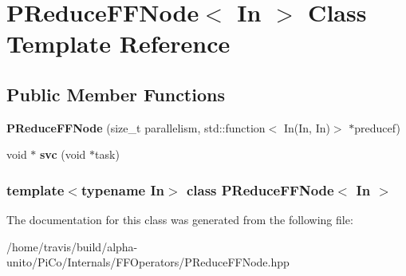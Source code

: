 \hypertarget{class_p_reduce_f_f_node}{\section{\-P\-Reduce\-F\-F\-Node$<$ \-In $>$ \-Class \-Template \-Reference}
\label{class_p_reduce_f_f_node}
}
\subsection*{\-Public \-Member \-Functions}
\begin{DoxyCompactItemize}
\item 
\hypertarget{class_p_reduce_f_f_node_a3ae9363397f2577359fd00dacd5c0bab}{{\bfseries \-P\-Reduce\-F\-F\-Node} (size\-\_\-t parallelism, std\-::function$<$ \-In(\-In, \-In)$>$ $\ast$preducef)}\label{class_p_reduce_f_f_node_a3ae9363397f2577359fd00dacd5c0bab}

\item 
\hypertarget{class_p_reduce_f_f_node_a6f425a4f78632b76cec0e7658bcf8c3b}{void $\ast$ {\bfseries svc} (void $\ast$task)}\label{class_p_reduce_f_f_node_a6f425a4f78632b76cec0e7658bcf8c3b}

\end{DoxyCompactItemize}
\subsubsection*{template$<$typename \-In$>$ class P\-Reduce\-F\-F\-Node$<$ In $>$}



\-The documentation for this class was generated from the following file\-:\begin{DoxyCompactItemize}
\item 
/home/travis/build/alpha-\/unito/\-Pi\-Co/\-Internals/\-F\-F\-Operators/\-P\-Reduce\-F\-F\-Node.\-hpp\end{DoxyCompactItemize}
